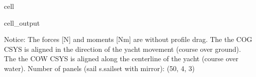 \documentclass[letterpaper,10pt,english]{jupyterBook}
\begin{document}
\begin{sphinxuseclass}{cell}
\begin{sphinxVerbatimOutput}
\begin{sphinxuseclass}{cell_output}
\begin{sphinxVerbatim}[commandchars=\\\{\}]
\PYGZhy{}\PYGZhy{}\PYGZhy{}\PYGZhy{}\PYGZhy{}\PYGZhy{}\PYGZhy{}\PYGZhy{}\PYGZhy{}\PYGZhy{}\PYGZhy{}\PYGZhy{}\PYGZhy{}\PYGZhy{}\PYGZhy{}\PYGZhy{}\PYGZhy{}\PYGZhy{}\PYGZhy{}\PYGZhy{}\PYGZhy{}\PYGZhy{}\PYGZhy{}\PYGZhy{}\PYGZhy{}\PYGZhy{}\PYGZhy{}\PYGZhy{}\PYGZhy{}\PYGZhy{}\PYGZhy{}\PYGZhy{}\PYGZhy{}\PYGZhy{}\PYGZhy{}\PYGZhy{}\PYGZhy{}\PYGZhy{}\PYGZhy{}\PYGZhy{}\PYGZhy{}\PYGZhy{}\PYGZhy{}\PYGZhy{}\PYGZhy{}\PYGZhy{}\PYGZhy{}\PYGZhy{}\PYGZhy{}\PYGZhy{}\PYGZhy{}\PYGZhy{}\PYGZhy{}\PYGZhy{}\PYGZhy{}\PYGZhy{}\PYGZhy{}\PYGZhy{}\PYGZhy{}\PYGZhy{}\PYGZhy{}
Notice:
	The forces [N] and moments [Nm] are without profile drag.
	The the \PYGZus{}COG\PYGZus{} CSYS is aligned in the direction of the yacht movement (course over ground).
	The the \PYGZus{}COW\PYGZus{} CSYS is aligned along the centerline of the yacht (course over water).
	Number of panels (sail s.sail\PYGZus{}set with mirror): (50, 4, 3)
\end{sphinxVerbatim}


\end{sphinxuseclass}
\end{sphinxVerbatimOutput}
\end{sphinxuseclass}
\end{document}
